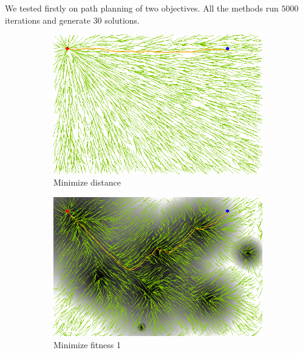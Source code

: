 \documentclass[conference]{IEEEtran}
\begin{document}
We tested firstly on path planning of two objectives.
All the methods run $ 5000 $ iterations and generate $ 30 $ solutions.

\begin{figure}
	\centering
	\begin{subfigure}[b]{0.45\linewidth}
		\centering
		\includegraphics[width=\textwidth]{fig/sim2-2obj/MORRTstar00-0.png}
		\caption{Minimize distance}
		\label{fig:sim:norm:distance}
	\end{subfigure}
	\begin{subfigure}[b]{0.45\linewidth}
		\centering
		\includegraphics[width=\textwidth]{fig/sim2-2obj/MORRTstar00-1.png}
		\caption{Minimize fitness 1}
		\label{fig:sim:norm:fitness1}
	\end{subfigure}  \\
	\begin{subfigure}[b]{0.45\linewidth}
		\centering

\end{subfigure}
\end{figure}
\end{document}
